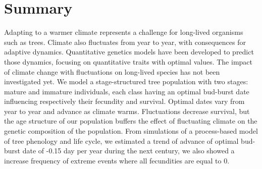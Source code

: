 \section*{Summary}

Adapting to a warmer climate represents a challenge for long-lived organisms such as trees. Climate also fluctuates from year to year, with consequences for adaptive dynamics. Quantitative genetics models have been developed to predict those dynamics, focusing on quantitative traits with optimal values. The impact of climate change with fluctuations on long-lived species has not been investigated yet.
We model a stage-structured tree population with two stages: mature and immature individuals, each class having an optimal bud-burst date influencing respectively their fecundity and survival. Optimal dates vary from year to year and advance as climate warms.
Fluctuations decrease survival, but the age structure of our population buffers the effect of fluctuating climate on the genetic composition of the population. From simulations of a process-based model of tree phenology and life cycle, we estimated a trend of advance of optimal bud-burst date of -0.15 day per year during the next century, we also showed a increase frequency of extreme events where all fecundities are equal to 0.